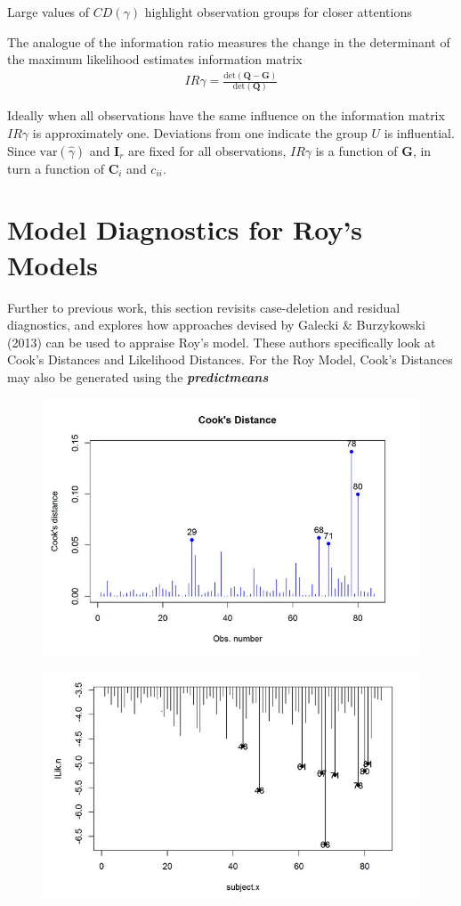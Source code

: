\documentclass[12pt, a4paper]{report}
\theoremstyle{plain}
\theoremstyle{definition}
\theoremstyle{remark}
\begin{document}
Large values of $CD(\gamma)$ highlight observation groups for closer attentions

The analogue of the information ratio measures the change in the determinant of the maximum likelihood estimates information matrix
\begin{eqnarray*}
	IR{\gamma}  = \frac{\mbox{det}(\boldsymbol{Q} - \boldsymbol{G})}{\mbox{det}(\boldsymbol{Q})}
\end{eqnarray*}

Ideally when all observations have the same influence on the information matrix $IR{\gamma}$ is approximately one.
Deviations from one indicate the group $U$ is influential. Since $\mbox{var}(\hat{\gamma})$ and $\boldsymbol{I}_{r}$ are fixed for all observations, $IR{\gamma}$ is a function of $\boldsymbol{G}$, in turn a function of $\boldsymbol{C}_{i}$ and $c_{ii}$.
\newpage


\section{Model Diagnostics for Roy's Models}

Further to previous work, this section revisits case-deletion and residual diagnostics, and explores how approaches devised by  Galecki \& Burzykowski (2013) can be used to appraise Roy's model. These authors specifically look at Cook's Distances and Likelihood Distances.
For the Roy Model, Cook's Distances may also be generated using the \textbf{\textit{predictmeans}}



\begin{figure}[h!]
	\centering
	\includegraphics[width=0.7\linewidth]{images/CooksDistancePlot-JS-Roy}
	\caption{}
	\label{fig:CooksDistancePlot-JS-Roy}
\end{figure}

\begin{figure}[h!]
	\centering
	\includegraphics[width=0.7\linewidth]{images/LogLik-JS-Roy}
	\caption{}
	\label{fig:LogLik-JS-Roy}
\end{figure}
\end{document}
